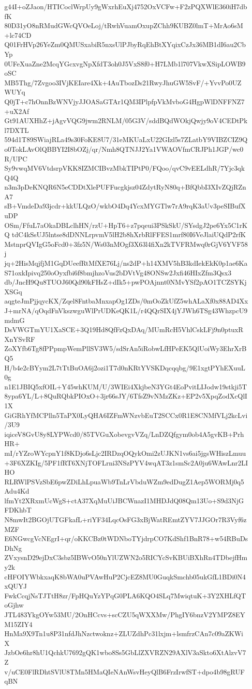 g44I+oZJaon/HTICoclWrpUy9gWxrhEuXj4752OxVCFw+F2zPQXWlE360iH7dbfK
80D31yO8nRMudGWcQVOeLoj/tRwhVuamOxupZChh9KUBZ0lmT+MrAo6sM+lc74CD
Q01FrHVp26YeZm0QMUSxabiR5nxsUlPJbyRqEhBtXYqixCzJx36MB1dI6au2CbYp
0UFeXuaZne2McqYGcxvgNpXfdT3oh0J5VxS8f0+H7LMb1l707VkwXSipLOWB9oSC
MB5Thg/7Zvgoo3IVjKEIare4Xk+4AuTbozDs21RwyJhuGW5SvF/+YvvPo0UZWUYq
Q0jT+c7hOnnBzWNVjyJJOASaGTAr1QM3IPlpfpVkMvboG4HgpWlDNFFNZ7+uX2Af
Gt91AUXHhZ+jAgvVQG9jwm2RNLM/05G3V/sddBQdWOkjQwjy9oV4CEDtPkl7DXTL
594d1T89SWiajRLa49s30FoKE8U7/31eMKUaLxU22GIzl5s7ZLatbY9VIBZCIZ9Q
o0TokLAvOlQBBYI2I8bOZj/qr/Nmh8QTNJJ2Ya1VWAOVfmCRJPh1JGP/wc0R/UPC
Sy9vwqMV6VtdsrpVKK8IZMCIBvzMbkTIPtP0/FQoo/qvC9vEELdhR/7Yjc3qkQ4Q
n3m3pDeKNQR6N5eCDDtXlePUFFucgkjsz04ZdytRyN80q+BfQbbI3XIvZQjRZnA7
sB+VmdeDa93jcdr+kkULQzO/wkbO4Dq4YcxMYGTlw7rA9rqK3aUv3peSIBufXuDP
OSm/FfuL7aOkaDBLclhHN/rzU+HpT6+z7pqeui3PSkSkU/SYsdgJ2pe6Yx5C1rKQ
tdC4kSsUJ5lntse8dDNNLrpvmV5lH2b8hXrbRlFFES1mrf80I6VeJlaiUQdP2rfK
MstnprQVIgG5oFcd0+3fz5N/Ws03nMOgf3X63l4fiXn2kTVFRMwq0rGjV6YVF58j
jq+2HisMqjfjM1GqDUeefRtMfXE76Lj/ns2dP+h14XMV5hB3kdIekEkK0p1ae6Ka
S71oxkIpivq250oOyxfbi6f8bmjhzoVus2bDVtVg48ONSw2Jxfi46HIxZfm3Qsx3
db/JncH9Qu8TUOJ60Qd90kFHsZ+dIk5+pwPOAjnnt0NMvYSf2pAO1TCZSYKjXSGq
aqgteJmPjjqycKX/Zqel8FntbaMnxapOg1ZDs/0mOoZkUfZ5whALaXf0x88AD4Xx
J+mrNA/qOqdFnVkszwguWlPrUDKeQK1L/r4QQrSIX4jYJWh6TSg43WhzpcU9mdmG
DsVWGTmYU1XaSCE+3Q19Hd8QfFzQxDAq/MUmRcH5VhlCskLFj9n0ptuxRXnYSvRF
ZoXYfb6Tg8fPPpmpWemPllSV3W5/sdSrAn5iRobwLfHPeEK5QlUoiWy3EhrXrBQ5
H/b4e2cBYym2L7tTtBuOA6j2ozi1T7d0nKRtYVSKDqcqqbg/9E1xgtPYhEXuuL0g
n1E1JBIQ5xfOIL+Y45whKUM/U/3WIEi4XkjbeN3YGt4EoPvitLIJodw19stkji5T
8ypa6YL/L+8QuRQbkPIOxO+3jr66sJY/6TfsZ9vNMzZKz+EP2v5XpqZodXcQlI1X
GiGRhYfMCPlln5TaPX0LyQHA6IZFmWNzvbEuT2SCCx0R1E8CNMfVLj2kcLvi/3U9
iqiceV8GvU8y8LYPWcd0/85TVGuXobevgvVZq/LnDZQfgym0ob4A5gvKB+PrhHR+
mI/rYZroWYcpnY1f8KDjo6sLjc2IRDzqOQykOmi2zUJKN1vs6ai5jgsWHiszLmuu
+3F6XZKIg/5PF1fRT6XNjTOFLrni3NSzPYV4wqAT3z1smSc2A0ju6WAwLnr2LIHO
RLRWlPSVzSbE6pwZDiLhLpuaWb9TnLrVbduWZm9edDugZ1Aep5WORMj0q5Adu4Kd
lfmYt2XRxmUcWgS+ctA37XqMuUiJBCWnazI1MHDJdQ08Qm13Uo+S9d3NjGFDKhbT
N8mwIt2BGOjUTGFkafL+riYF34LqcOsFG3xBjWatREmtZYV7JJGOr7R3Vyf6zMZF
E6NGwcgVcNEgrI+qr/oKKCBz0tWDNboTYjdrpCO7KdShf1BnR78+w54RBuDsDhNg
ZVxysnD29ejDxC3sbz5IBWvO50nYlUZWN2o5RICYcSvKBUiBXhRn4TDbejfHmy2k
cHFOIYWbkxaqK8bWA0uPVAwHuP2CjcEZ8MU0GuqkSmchb05ukGfL1BDi0N4xQUYJ
FwkCcqjNsTJTtH8zr/FpHQuYzYPqG0PLA6KQO4SLq7MwiqtuK+3Y2XHLfQToGjhw
JTL483YkgOYw53MU/2OnHCcvs+scCZU5qWXXMw/PhgIY6bnzV2YMPZ8EYM15ZIY4
HnMa9X9Tn1u8P31nfdJhNzctwoknz+ZLUZdhPc31lxjm+lsmfrzCAn7c09aZKWiX
JzbOe6hr8hU1QchkU7692gQK1wbo8Ss5GbLlZXVRZN29AXlV3aSkto6XtAlzvV7Z
v/uCE0FlRDhtSVlU8TMn5HMaQIeNAnWsvHeyQlB6FrzIrwfST+dpo4b98gRUFqBN
